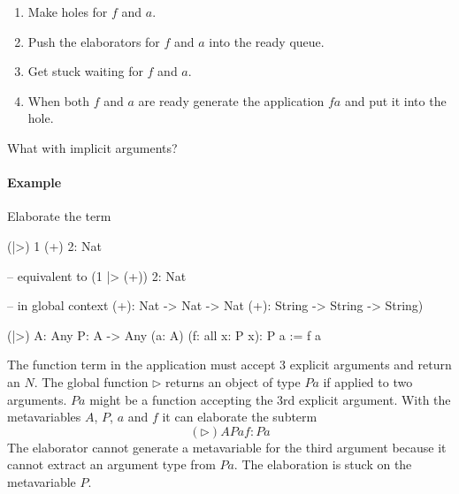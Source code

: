 \begin{enumerate}
    \item Make holes for $f$ and $a$.

    \item Push the elaborators for $f$ and $a$ into the ready queue.

    \item Get stuck waiting for $f$ and $a$.

    \item When both $f$ and $a$ are ready generate the application $f a$ and put
        it into the hole.
\end{enumerate}


What with implicit arguments?



\paragraph{Example}
Elaborate the term
\begin{alba}
    (|>) 1 (+) 2: Nat

    -- equivalent to
    (1 |> (+)) 2: Nat

    -- in global context
    (+): Nat -> Nat -> Nat
    (+): String -> String -> String)

    (|>) {A: Any} {P: A -> Any} (a: A) (f: all x: P x): P a
    :=
        f a
\end{alba}



The function term in the application must accept 3 explicit arguments and return
an $N$. The global function $\triangleright$ returns an object of type $P a$ if
applied to two arguments. $P a$ might be a function accepting the 3rd explicit
argument. With the metavariables $A$, $P$, $a$ and $f$ it can elaborate the
subterm
$$
(\triangleright) A P a f: P a
$$
The elaborator cannot generate a metavariable for the third argument because it
cannot extract an argument type from $P a$. The elaboration is stuck on the
metavariable $P$.

